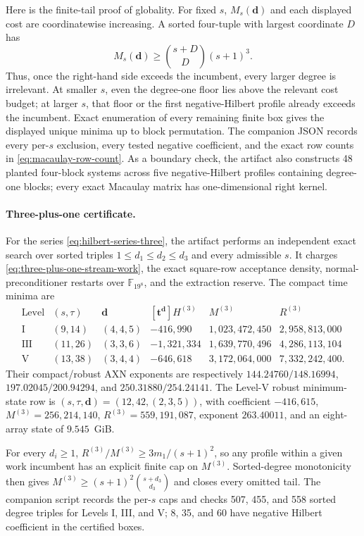 \documentclass[11pt]{article}
\newcommand{\F}{\mathbb F}
\begin{document}
Here is the finite-tail proof of globality.  For fixed $s$,
$M_s(\mathbf d)$ and each displayed cost are coordinatewise increasing.  A
sorted four-tuple with largest coordinate $D$ has
\[
 M_s(\mathbf d)\ge
 \binom{s+D}{D}(s+1)^3.
\]
Thus, once the right-hand side exceeds the incumbent, every larger degree is
irrelevant.  At smaller $s$, even the degree-one floor lies above the relevant
cost budget; at larger $s$, that floor or the first negative-Hilbert profile
already exceeds the incumbent.  Exact enumeration of every remaining finite
box gives the displayed unique minima up to block permutation.  The companion
JSON records every per-$s$ exclusion, every tested negative coefficient, and
the exact row counts in \eqref{eq:macaulay-row-count}.  As a boundary check,
the artifact also constructs 48 planted four-block systems across five
negative-Hilbert profiles containing degree-one blocks; every exact Macaulay
matrix has one-dimensional right kernel.

\paragraph{Three-plus-one certificate.}
For the series \eqref{eq:hilbert-series-three}, the artifact performs an
independent exact search over sorted triples $1\le d_1\le d_2\le d_3$ and every
admissible $s$.  It charges \eqref{eq:three-plus-one-stream-work}, the exact
square-row acceptance density, normal-preconditioner restarts over
$\F_{19^8}$, and the extraction reserve.  The compact time minima are
\[
\begin{array}{c|c|c|r|r|r}
\text{Level}&(s,\tau)&\mathbf d&[\mathbf t^{\mathbf d}]H^{(3)}&M^{(3)}&R^{(3)}\\\hline
\mathrm I&(9,14)&(4,4,5)&-416{,}990&1{,}023{,}472{,}450&2{,}958{,}813{,}000\\
\mathrm{III}&(11,26)&(3,3,6)&-1{,}321{,}334&1{,}639{,}770{,}496&4{,}286{,}113{,}104\\
\mathrm V&(13,38)&(3,4,4)&-646{,}618&3{,}172{,}064{,}000&7{,}332{,}242{,}400.
\end{array}
\]
Their compact/robust AXN exponents are respectively
$144.24760/148.16994$, $197.02045/200.94294$, and
$250.31880/254.24141$.  The Level-V robust minimum-state row is
$(s,\tau,\mathbf d)=(12,42,(2,3,5))$, with coefficient $-416{,}615$,
$M^{(3)}=256{,}214{,}140$, $R^{(3)}=559{,}191{,}087$, exponent
$263.40011$, and an eight-array state of $9.545$~GiB.

For every $d_i\ge1$,
$R^{(3)}/M^{(3)}\ge3m_1/(s+1)^2$, so any profile within a given work incumbent
has an explicit finite cap on $M^{(3)}$.  Sorted-degree monotonicity then gives
$M^{(3)}\ge(s+1)^2\binom{s+d_3}{d_3}$ and closes every omitted tail.  The
companion script records the per-$s$ caps and checks 507, 455, and 558 sorted
degree triples for Levels I, III, and V; 8, 35, and 60 have negative Hilbert
coefficient in the certified boxes.
\end{document}
